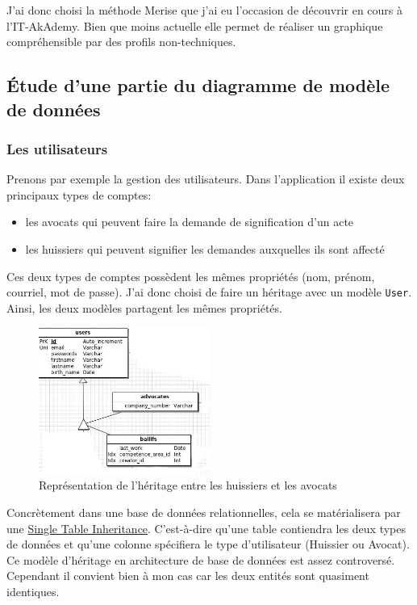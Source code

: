 \documentclass[]{report}
\begin{document}
    J'ai donc choisi la méthode Merise que j'ai eu l'occasion de découvrir en cours à l'IT-AkAdemy. Bien que moins actuelle elle permet de réaliser un graphique compréhensible par des profils non-techniques.

    \subsection{Étude d'une partie du diagramme de modèle de données}

      \subsubsection{Les utilisateurs}

        Prenons par exemple la gestion des utilisateurs. Dans l'application il existe deux principaux types de comptes:

        \begin{itemize}
          \item les avocats qui peuvent faire la demande de signification d'un acte
          \item les huissiers qui peuvent signifier les demandes auxquelles ils sont affecté
        \end{itemize}

        Ces deux types de comptes possèdent les mêmes propriétés (nom, prénom, courriel, mot de passe). J'ai donc choisi de faire un héritage avec un modèle \verb|User|. Ainsi, les deux modèles partagent les mêmes propriétés.

        \begin{figure}
          \centering
          \includegraphics[width=0.5\textwidth]{img/merise_users.png}
          \caption{Représentation de l'héritage entre les huissiers et les avocats}
        \end{figure}

        Concrètement dans une base de données relationnelles, cela se matérialisera par une \href{https://en.wikipedia.org/wiki/Single_Table_Inheritance}{Single Table Inheritance}. C'est-à-dire qu'une table contiendra les deux types de données et qu'une colonne spécifiera le type d'utilisateur (Huissier ou Avocat). Ce modèle d'héritage en architecture de base de données est assez controversé. Cependant il convient bien à mon cas car les deux entités sont quasiment identiques.
\end{document}
